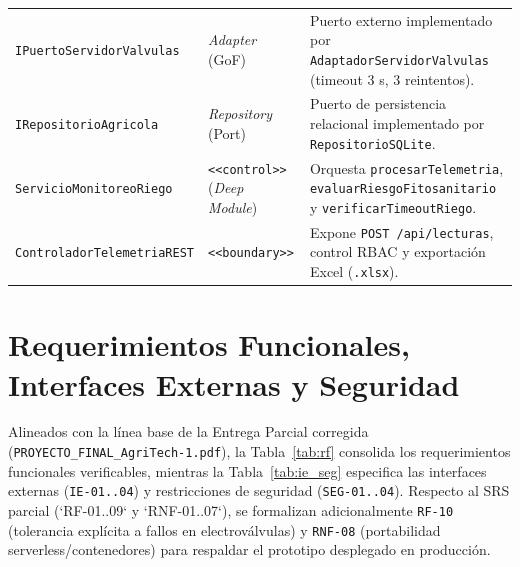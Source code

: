 \documentclass[11pt,letterpaper]{report}
\begin{document}
\begin{table}[H]
\begin{tabularx}{\textwidth}{l L{3.6cm} Y}
\texttt{IPuertoServidorValvulas} & \textit{Adapter} (GoF) & Puerto externo implementado por \texttt{AdaptadorServidorValvulas} (timeout 3 s, 3 reintentos). \\
\texttt{IRepositorioAgricola} & \textit{Repository} (Port) & Puerto de persistencia relacional implementado por \texttt{RepositorioSQLite}. \\
\texttt{ServicioMonitoreoRiego} & \texttt{<<control>>} (\textit{Deep Module}) & Orquesta \texttt{procesarTelemetria}, \texttt{evaluarRiesgoFitosanitario} y \texttt{verificarTimeoutRiego}. \\
\texttt{ControladorTelemetriaREST} & \texttt{<<boundary>>} & Expone \texttt{POST /api/lecturas}, control RBAC y exportación Excel (\texttt{.xlsx}). \\
\bottomrule
\end{tabularx}
\end{table}

\section{Requerimientos Funcionales, Interfaces Externas y Seguridad}
Alineados con la línea base de la Entrega Parcial corregida (\texttt{PROYECTO\_\allowbreak FINAL\_\allowbreak AgriTech-1.pdf}), la Tabla~\ref{tab:rf} consolida los requerimientos funcionales verificables, mientras la Tabla~\ref{tab:ie_seg} especifica las interfaces externas (\texttt{IE-01..04}) y restricciones de seguridad (\texttt{SEG-01..04}). Respecto al SRS parcial (`RF-01..09` y `RNF-01..07`), se formalizan adicionalmente \texttt{RF-10} (tolerancia explícita a fallos en electroválvulas) y \texttt{RNF-08} (portabilidad serverless/contenedores) para respaldar el prototipo desplegado en producción.
\end{document}
